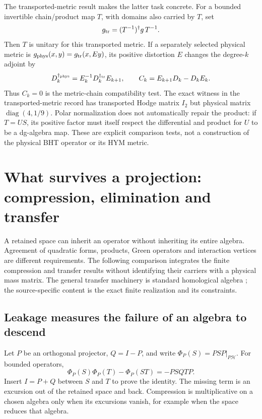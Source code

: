 \documentclass[11pt,a4paper]{article}
\begin{document}
The transported-metric result makes the latter task concrete. For a bounded
invertible chain/product map \(T\), with domains also carried by \(T\), set
\[
g_{\rm tr}=(T^{-1})^\dagger g\,T^{-1}.
\]
Then \(T\) is unitary for this transported metric. If a separately selected
physical metric is \(g_{\rm phys}(x,y)=g_{\rm tr}(x,Ey)\), its positive
distortion \(E\) changes the degree-\(k\) adjoint by
\[
D_k^{\dagger_{\rm phys}}
 =E_k^{-1}D_k^{\dagger_{\rm tr}}E_{k+1},\qquad
C_k=E_{k+1}D_k-D_kE_k .
\]
Thus \(C_k=0\) is the metric-chain compatibility test. The exact witness
in the transported-metric record has transported Hodge matrix \(I_2\)
but physical matrix \(\operatorname{diag}(4,1/9)\). Polar normalization
does not automatically repair the product: if \(T=US\), its positive
factor must itself respect the differential and product for \(U\) to be
a dg-algebra map. These are explicit comparison tests, not a construction
of the physical BHT operator or its HYM metric.

\section{What survives a projection: compression, elimination and transfer}
\label{sec:compression-transfer}

A retained space can inherit an operator without inheriting its entire
algebra. Agreement of quadratic forms, products, Green operators and
interaction vertices are different requirements. The following comparison
integrates the finite compression and transfer results without identifying
their carriers with a physical mass matrix. The general transfer machinery
is standard homological algebra \cite{MarklTransfer2004,Merkulov1998}; the
source-specific content is the exact finite realization and its constraints.

\subsection{Leakage measures the failure of an algebra to descend}
\label{sec:compression-leakage}
Let \(P\) be an orthogonal projector, \(Q=I-P\), and write
\(\Phi_P(S)=PSP|_{P\mathcal H}\). For bounded operators,
\[
 \Phi_P(S)\Phi_P(T)-\Phi_P(ST)=-PSQTP.
\]
Insert \(I=P+Q\) between \(S\) and \(T\) to prove the identity. The missing
term is an excursion out of the retained space and back. Compression is
multiplicative on a chosen algebra only when its excursions vanish, for
example when the space reduces that algebra.
\end{document}

